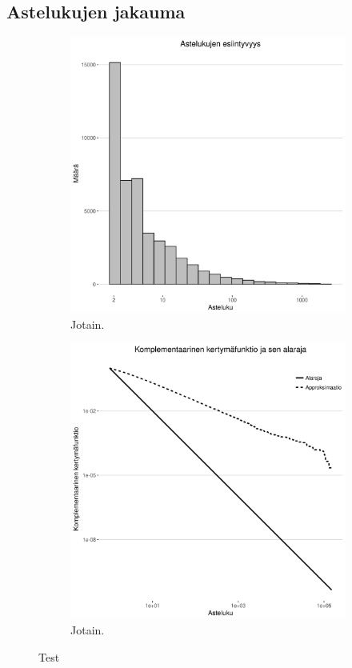 \documentclass[finnish, 12pt, a4paper, sci, utf8, pdfa]{aaltothesis}
\begin{document}
\subsection{Astelukujen jakauma}

\begin{figure}[htb]
\centering
   \begin{subfigure}[b]{0.47\textwidth}
      \includegraphics[width=\textwidth]{pictures/approx_hist.jpg}
      \caption{Jotain. \label{figure:approx_hist}}
   \end{subfigure}
   \quad
   \begin{subfigure}[b]{0.47\textwidth}
      \includegraphics[width=\textwidth]{pictures/approx_cdf.jpg}
      \caption{Jotain. \label{figure:approx_cdf}}
   \end{subfigure}
   \caption{Test}
   \label{figure:asteluku-sim}
\end{figure}
\end{document}
